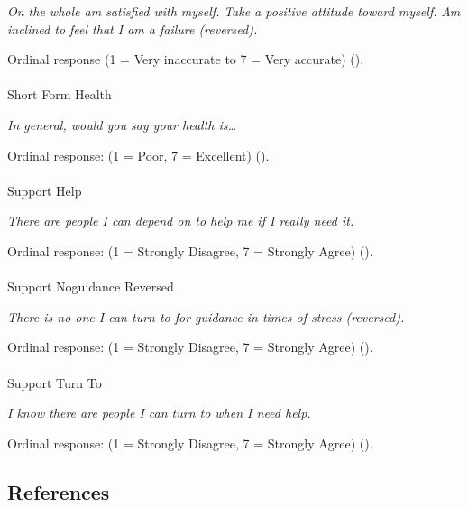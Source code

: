 \documentclass[
  single column]{article}
\makeatletter
\let\oldparagraph\paragraph
\renewcommand{\paragraph}{
    \@ifstar
      \xxxParagraphStar
      \xxxParagraphNoStar
  }
\newcommand{\xxxParagraphStar}[1]{\oldparagraph*{#1}\mbox{}}
\newcommand{\xxxParagraphNoStar}[1]{\oldparagraph{#1}\mbox{}}
\makeatother
\begin{document}
\emph{On the whole am satisfied with myself.} \emph{Take a positive
attitude toward myself.} \emph{Am inclined to feel that I am a failure
(reversed).}

Ordinal response (1 = Very inaccurate to 7 = Very accurate)
().

\paragraph{Short Form Health}\label{short-form-health}

\emph{In general, would you say your health is\ldots{}}

Ordinal response: (1 = Poor, 7 = Excellent)
().

\paragraph{Support Help}\label{support-help}

\emph{There are people I can depend on to help me if I really need it.}

Ordinal response: (1 = Strongly Disagree, 7 = Strongly Agree)
().

\paragraph{Support Noguidance
Reversed}\label{support-noguidance-reversed}

\emph{There is no one I can turn to for guidance in times of stress
(reversed).}

Ordinal response: (1 = Strongly Disagree, 7 = Strongly Agree)
().

\paragraph{Support Turn To}\label{support-turn-to}

\emph{I know there are people I can turn to when I need help.}

Ordinal response: (1 = Strongly Disagree, 7 = Strongly Agree)
().

\newpage{}

\subsection*{References}\label{references}
\end{document}
